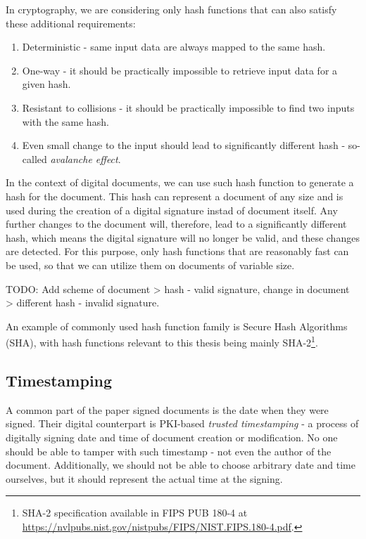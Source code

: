 \documentclass[thesismargins, english, thesislinespacing, twoside, openright, upjsfrontpage]{rnthesis}
\begin{document}
In cryptography, we are considering only hash functions that can also satisfy these additional requirements:

\begin{enumerate}
  \item Deterministic - same input data are always mapped to the same hash.
  \item One-way - it should be practically impossible to retrieve input data for a given hash.
  \item Resistant to collisions - it should be practically impossible to find two inputs with the same hash.
  \item Even small change to the input should lead to significantly different hash - so-called \textit{avalanche effect}.
\end{enumerate}

In the context of digital documents, we can use such hash function to generate a hash for the document.
This hash can represent a document of any size and is used during the creation of a digital signature instad of document itself.
Any further changes to the document will, therefore, lead to a significantly different hash, which means the digital signature will no longer be valid, and these changes are detected.
For this purpose, only hash functions that are reasonably fast can be used, so that we can utilize them on documents of variable size.

TODO: Add scheme of document > hash - valid signature, change in document > different hash - invalid signature.

An example of commonly used hash function family is Secure Hash Algorithms (SHA), with hash functions relevant to this thesis being mainly SHA-2\footnote{SHA-2 specification available in FIPS PUB 180-4 at \url{https://nvlpubs.nist.gov/nistpubs/FIPS/NIST.FIPS.180-4.pdf}.}.

\subsection{Timestamping}

A common part of the paper signed documents is the date when they were signed.
Their digital counterpart is PKI-based \textit{trusted timestamping} - a process of digitally signing date and time of document creation or modification.
No one should be able to tamper with such timestamp - not even the author of the document.
Additionally, we should not be able to choose arbitrary date and time ourselves, but it should represent the actual time at the signing.
\end{document}
